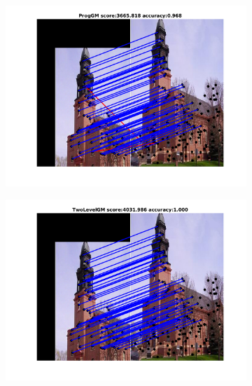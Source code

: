 \documentclass[
	fontsize=12pt,
	paper=a4,
	twoside=false,
	numbers=noenddot,
	plainheadsepline,
	toc=listof,
	toc=bibliography
]{scrartcl}
\begin{document}
\begin{figure}[h]
	\begin{subfigure}[b]{0.33\textwidth}
		\centering
		\includegraphics[scale=0.25]{"fig_ver2608/RealImages/ImgTrafo/no_descr/using_cpd_afftrafo/fi_4_ProgGM"} 
	\end{subfigure}%
	\begin{subfigure}[b]{0.33\textwidth}
		\centering
		\includegraphics[scale=0.25]{"fig_ver2608/RealImages/ImgTrafo/no_descr/using_cpd_afftrafo/fi_4_TwoLevelGM"} 
	\end{subfigure} 
	\begin{subfigure}[b]{0.33\textwidth}
		\centering

\end{subfigure}
\end{figure}
\end{document}

